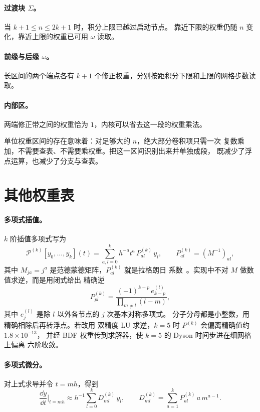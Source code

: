 \paragraph{过渡块 $\Sigma$。}
当 $k+1\le n\le 2k+1$ 时，积分上限已越过启动节点。
靠近下限的权重仍随 $n$ 变化，靠近上限的权重已可用 $\omega$ 读取。

\paragraph{前缘与后缘 $\omega$。}
长区间的两个端点各有 $k+1$ 个修正权重，分别按距积分下限和上限的网格步数读取。

\paragraph{内部区。}
两端修正带之间的权重恰为 $1$，内核可以省去这一段的权重乘法。

单位权重区间的存在意味着：对足够大的 $n$，绝大部分卷积项只需一次
复数乘加，不需要查表、不需要乘权重。把这一区间识别出来并单独成段，
既减少了浮点运算，也减少了分支与查表。

\section{其他权重表}
\label{sec:other-weights}

\paragraph{多项式插值。}
$k$ 阶插值多项式写为
\begin{equation}
    \mathcal{P}^{(k)}[y_0,\dots,y_k](t)
    = \sum^{k}_{a,l=0} h^{-a}t^{a}\,P^{(k)}_{al}\,y_l ,
    \qquad P^{(k)}_{al} = (M^{-1})_{al},
    \label{eq:poly-interp}
\end{equation}
其中 $M_{ja}=j^{a}$ 是范德蒙德矩阵，$P^{(k)}_{al}$ 就是拉格朗日
系数~\cite{press2007}。实现中不对 $M$ 做数值求逆，而是用闭式给出
精确逆
\begin{equation}
    P^{(k)}_{pl} = \frac{(-1)^{k-p}\,e^{(l)}_{k-p}}{\prod_{m\ne l}(l-m)},
    \label{eq:vandermonde-inverse}
\end{equation}
其中 $e^{(l)}_{j}$ 是除 $l$ 以外各节点的 $j$ 次基本对称多项式。
分子分母都是小整数，用  精确相除后再转浮点。若改用
双精度 LU 求逆，$k=5$ 时 $P^{(k)}$ 会偏离精确值约 $1.8\times 10^{-13}$，
并经 BDF 权重传到求解器，使 $k=5$ 的 Dyson 时间步进在细网格上偏离
六阶收敛。

\paragraph{多项式微分。}
对上式求导并令 $t=mh$，得到
\begin{equation}
    \frac{\dd y}{\dd t}\Big|_{t=mh}
    \approx h^{-1}\sum^{k}_{l=0} D^{(k)}_{ml}\,y_l,
    \qquad
    D^{(k)}_{ml} = \sum^{k}_{a=1} P^{(k)}_{al}\,a\,m^{a-1}.
    \label{eq:poly-diff}
\end{equation}

